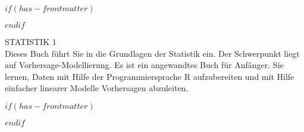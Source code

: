 
$if(has-frontmatter)$
  \begin{frontmatter}
$endif$



\begin{titlepage}
    \centering
    \vspace*{3cm}
    {\Huge STATISTIK 1\\}
    \vspace*{2cm}
    \noindent %
Dieses Buch führt Sie in die Grundlagen der Statistik ein.
Der Schwerpunkt liegt auf Vorhersage-Modellierung.
Es ist ein angewandtes Buch für Anfänger.
Sie lernen, Daten mit Hilfe der Programmiersprache R aufzubereiten 
und mit Hilfe einfacher linearer Modelle Vorhersagen abzuleiten.    

    \vfill
\end{titlepage}


\newpage
\null
\thispagestyle{empty} %
\newpage



\setcounter{page}{1}
$if(has-frontmatter)$
\end{frontmatter}
$endif$


